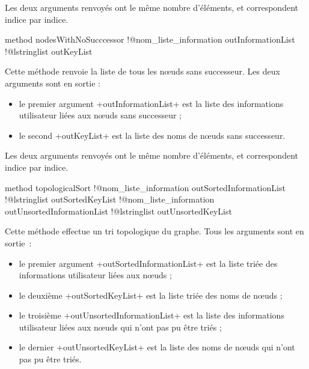Les deux arguments renvoyés ont le même nombre d'éléments, et correspondent indice par indice.







\begin{galgas3}
method nodesWithNoSucccessor
  !@nom_liste_information outInformationList
  !@lstringlist outKeyList
\end{galgas3}

Cette méthode renvoie la liste de tous les nœuds sans successeur. Les deux arguments sont en sortie :
\begin{itemize}
  \item le premier argument \ggst+outInformationList+ est la liste des informations utilisateur liées aux nœuds sans successeur ;
  \item le second \ggst+outKeyList+ est la liste des noms de nœuds sans successeur.
\end{itemize}

Les deux arguments renvoyés ont le même nombre d'éléments, et correspondent indice par indice.






\begin{galgas3}
method topologicalSort
  !@nom_liste_information outSortedInformationList
  !@lstringlist outSortedKeyList
  !@nom_liste_information outUnsortedInformationList
  !@lstringlist outUnsortedKeyList
\end{galgas3}

Cette méthode effectue un tri topologique du graphe. Tous les arguments sont en sortie~:
\begin{itemize}
  \item le premier argument \ggst+outSortedInformationList+ est la liste triée des informations utilisateur liées aux nœuds ;
  \item le deuxième \ggst+outSortedKeyList+ est la liste triée des noms de nœuds ;
  \item le troisième \ggst+outUnsortedInformationList+ est la liste des informations utilisateur liées aux nœuds qui n'ont pas pu être triés ;
  \item le dernier \ggst+outUnsortedKeyList+ est la liste des noms de nœuds qui n'ont pas pu être triés.
\end{itemize}

